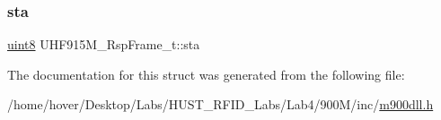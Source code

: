 \subsubsection{\texorpdfstring{sta}{sta}}
{\footnotesize\ttfamily \mbox{\hyperlink{m900dll_8h_adde6aaee8457bee49c2a92621fe22b79}{uint8}} U\+H\+F915\+M\+\_\+\+Rsp\+Frame\+\_\+t\+::sta}



The documentation for this struct was generated from the following file\+:\begin{DoxyCompactItemize}
\item 
/home/hover/\+Desktop/\+Labs/\+H\+U\+S\+T\+\_\+\+R\+F\+I\+D\+\_\+\+Labs/\+Lab4/900\+M/inc/\mbox{\hyperlink{m900dll_8h}{m900dll.\+h}}\end{DoxyCompactItemize}
